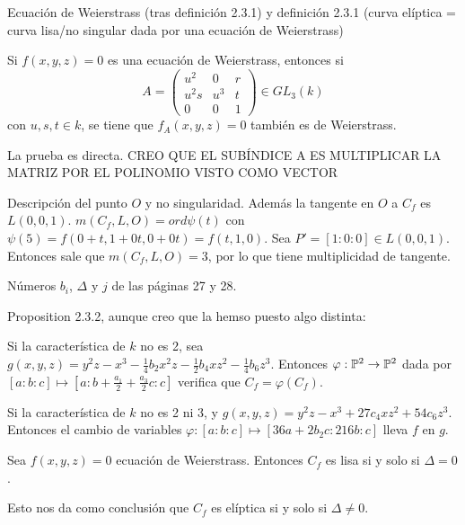 \documentclass[CR.tex]{subfiles}
\begin{document}
Ecuación de Weierstrass (tras definición 2.3.1) y definición 2.3.1 (curva elíptica = curva lisa/no singular dada por una ecuación de Weierstrass)

\begin{lemma}
Si $f(x,y,z)=0$ es una ecuación de Weierstrass, entonces si
\[
A=\begin{pmatrix}
u^2 & 0 & r\\
u^2s & u^3 & t\\
0 & 0 & 1
\end{pmatrix}\in GL_3(k)
\]
con $u,s,t\in k$, se tiene que $f_A(x,y,z)=0$ también es de Weierstrass.
\end{lemma}
La prueba es directa. CREO QUE EL SUBÍNDICE A ES MULTIPLICAR LA MATRIZ POR EL POLINOMIO VISTO COMO VECTOR

Descripción del punto $O$ y no singularidad. Además la tangente en $O$ a $C_f$ es $L(0,0,1)$. $m(C_f,L,O)=ord\psi(t)$ con $\psi(5)=f(0+t,1+0t,0+0t)=f(t,1,0)$. Sea $P'=[1:0:0]\in L(0,0,1)$. Entonces sale que $m(C_f,L,O)=3$, por lo que tiene multiplicidad de tangente. 

Números $b_i$, $\Delta$ y $j$ de las páginas 27 y 28. 


Proposition 2.3.2, aunque creo que la hemso puesto algo distinta:

\begin{lemma}
Si la característica de $k$ no es 2, sea $g(x,y,z)=y^2z-x^3-\frac{1}{4}b_2x^2z-\frac{1}{2}b_4xz^2-\frac{1}{4}b_6z^3$. Entonces $\varphi:\mathbb{P}^2\to \mathbb{P}^2$ dada por $[a:b:c]\mapsto [a:b+\frac{a_1}{2}+\frac{a_3}{2}c:c]$ verifica que $C_f=\varphi(C_f)$.
\end{lemma}

\begin{lemma}[en la página 26]
Si la característica de $k$ no es 2 ni 3, y $g(x,y,z)=y^2z-x^3+27c_4xz^2+54c_6z^3$. Entonces el cambio de variables $\varphi:[a:b:c]\mapsto [36a+2b_2c:216b:c]$ lleva $f$ en $g$. 
\end{lemma}

\begin{prop}[2.3.3]
Sea $f(x,y,z)=0$ ecuación de Weierstrass. Entonces $C_f$ es lisa si y solo si $\Delta=0$.
\end{prop}

Esto nos da como conclusión que $C_f$ es elíptica si y solo si $\Delta\neq 0$.


\begin{prop}
\end{prop}
\end{document}
